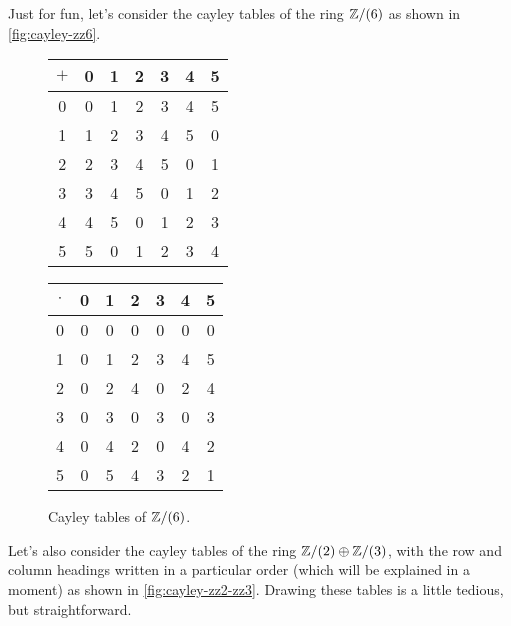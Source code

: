 Just for fun, let's consider the cayley tables of the ring \(\mathbb{Z}/(6)\) as shown in \autoref{fig:cayley-zz6}.
\begin{figure}[h!]
\begin{center}
\begin{tabular}{c|cccccc}
\(+\)
  & 0 & 1 & 2 & 3 & 4 & 5 \\ \hline
0 & 0 & 1 & 2 & 3 & 4 & 5 \\
1 & 1 & 2 & 3 & 4 & 5 & 0 \\
2 & 2 & 3 & 4 & 5 & 0 & 1 \\
3 & 3 & 4 & 5 & 0 & 1 & 2 \\
4 & 4 & 5 & 0 & 1 & 2 & 3 \\
5 & 5 & 0 & 1 & 2 & 3 & 4
\end{tabular}
\quad\quad
\begin{tabular}{c|cccccc}
\(\cdot\)
  & 0 & 1 & 2 & 3 & 4 & 5\\ \hline
0 & 0 & 0 & 0 & 0 & 0 & 0 \\
1 & 0 & 1 & 2 & 3 & 4 & 5 \\
2 & 0 & 2 & 4 & 0 & 2 & 4 \\
3 & 0 & 3 & 0 & 3 & 0 & 3 \\
4 & 0 & 4 & 2 & 0 & 4 & 2 \\
5 & 0 & 5 & 4 & 3 & 2 & 1 \\
\end{tabular}
\caption{Cayley tables of \(\mathbb{Z}/(6)\). \label{fig:cayley-zz6}}
\end{center}
\end{figure}
Let's also consider the cayley tables of the ring \(\mathbb{Z}/(2) \oplus \mathbb{Z}/(3)\), with the row and column headings written in a particular order (which will be explained in a moment) as shown in \autoref{fig:cayley-zz2-zz3}. Drawing these tables is a little tedious, but straightforward.
